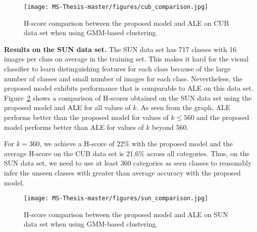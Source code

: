 \par
\medskip

\begin{figure}[h]
\centering
\texttt{[image: MS-Thesis-master/figures/cub\_comparison.jpg]}
\caption{H-score comparison between the proposed model and ALE on CUB data set when using GMM-based clustering.}
\label{image:cub_comparison}
\end{figure}

\par
\medskip
\noindent
\textbf{Results on the SUN data set.} The SUN data set has 717 classes with 16 images per class on average in the training set. This makes it hard for the visual classifier to learn distinguishing features for each class because of the large number of classes and small number of images for each class. Nevertheless, the proposed model exhibits performance that is comparable to ALE on this data set. Figure~\ref{image:sun_comparison} shows a comparison of H-scores obtained on the SUN data set using the proposed model and ALE for all values of $k$. As seen from the graph, ALE performs better than the proposed model for values of $k \leq 560$ and the proposed model performs better than ALE for values of $k$ beyond 560.

\par
\medskip

For $k = 360$, we achieve a H-score of 22\% with the proposed model and the average H-score on the CUB data set is 21.6\% across all categories. Thus, on the SUN data set, we need to use at least 360 categories as seen classes to reasonably infer the unseen classes with greater than average accuracy with the proposed model.

\par
\medskip

\begin{figure}[h]
\centering
\texttt{[image: MS-Thesis-master/figures/sun\_comparison.jpg]}
\caption{H-score comparison between the proposed model and ALE on SUN data set when using GMM-based clustering.}
\label{image:sun_comparison}
\end{figure}

\par
\medskip

